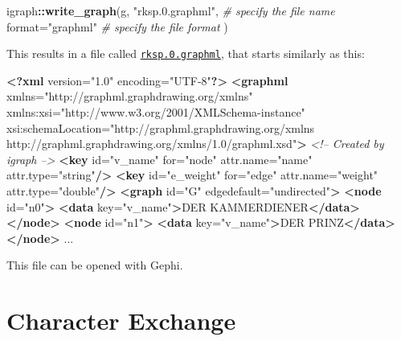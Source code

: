 \documentclass[]{book}
\newenvironment{Shaded}{\begin{snugshade}}{\end{snugshade}}
\newcommand{\CommentTok}[1]{\textcolor[rgb]{0.56,0.35,0.01}{\textit{#1}}}
\newcommand{\DataTypeTok}[1]{\textcolor[rgb]{0.13,0.29,0.53}{#1}}
\newcommand{\KeywordTok}[1]{\textcolor[rgb]{0.13,0.29,0.53}{\textbf{#1}}}
\newcommand{\NormalTok}[1]{#1}
\newcommand{\OperatorTok}[1]{\textcolor[rgb]{0.81,0.36,0.00}{\textbf{#1}}}
\newcommand{\OtherTok}[1]{\textcolor[rgb]{0.56,0.35,0.01}{#1}}
\newcommand{\StringTok}[1]{\textcolor[rgb]{0.31,0.60,0.02}{#1}}
\begin{document}
\begin{Shaded}
\begin{Highlighting}[]
\NormalTok{igraph}\OperatorTok{::}\KeywordTok{write_graph}\NormalTok{(g, }
                    \StringTok{"rksp.0.graphml"}\NormalTok{,    }\CommentTok{# specify the file name}
                    \DataTypeTok{format=}\StringTok{"graphml"}     \CommentTok{# specify the file format}
\NormalTok{)}
\end{Highlighting}
\end{Shaded}

This results in a file called \href{rksp.0.graphml}{\texttt{rksp.0.graphml}}, that starts similarly as this:

\begin{Shaded}
\begin{Highlighting}[]
\KeywordTok{<?xml}\NormalTok{ version="1.0" encoding="UTF-8"}\KeywordTok{?>}
\KeywordTok{<graphml}\OtherTok{ xmlns=}\StringTok{"http://graphml.graphdrawing.org/xmlns"}
\OtherTok{         xmlns:xsi=}\StringTok{"http://www.w3.org/2001/XMLSchema-instance"}
\OtherTok{         xsi:schemaLocation=}\StringTok{"http://graphml.graphdrawing.org/xmlns}
\StringTok{         http://graphml.graphdrawing.org/xmlns/1.0/graphml.xsd"}\KeywordTok{>}
\CommentTok{<!-- Created by igraph -->}
  \KeywordTok{<key}\OtherTok{ id=}\StringTok{"v_name"}\OtherTok{ for=}\StringTok{"node"}\OtherTok{ attr.name=}\StringTok{"name"}\OtherTok{ attr.type=}\StringTok{"string"}\KeywordTok{/>}
  \KeywordTok{<key}\OtherTok{ id=}\StringTok{"e_weight"}\OtherTok{ for=}\StringTok{"edge"}\OtherTok{ attr.name=}\StringTok{"weight"}\OtherTok{ attr.type=}\StringTok{"double"}\KeywordTok{/>}
  \KeywordTok{<graph}\OtherTok{ id=}\StringTok{"G"}\OtherTok{ edgedefault=}\StringTok{"undirected"}\KeywordTok{>}
    \KeywordTok{<node}\OtherTok{ id=}\StringTok{"n0"}\KeywordTok{>}
      \KeywordTok{<data}\OtherTok{ key=}\StringTok{"v_name"}\KeywordTok{>}\NormalTok{DER KAMMERDIENER}\KeywordTok{</data>}
    \KeywordTok{</node>}
    \KeywordTok{<node}\OtherTok{ id=}\StringTok{"n1"}\KeywordTok{>}
      \KeywordTok{<data}\OtherTok{ key=}\StringTok{"v_name"}\KeywordTok{>}\NormalTok{DER PRINZ}\KeywordTok{</data>}
    \KeywordTok{</node>}
\NormalTok{    ...}
\end{Highlighting}
\end{Shaded}

This file can be opened with Gephi.

\hypertarget{character-exchange}{%
\chapter{Character Exchange}\label{character-exchange}}
\end{document}
